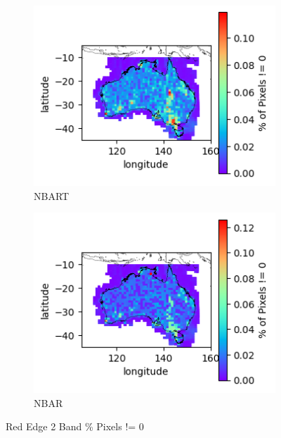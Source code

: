 \documentclass[a4paper]{article}
\begin{document}
      \begin{figure}[h!]
        \centering
          \begin{subfigure}[l]{.4\linewidth}
            \hspace{-32mm}
            \includegraphics[scale=0.9]{plots/nbart/nbart_red_edge_2-PercentDifferent.png}
            \caption{NBART}
          \end{subfigure}
%
          \begin{subfigure}[r]{.4\linewidth}
            \includegraphics[scale=0.9]{plots/nbar/nbar_red_edge_2-PercentDifferent.png}
            \caption{NBAR}
          \end{subfigure}
        \caption{Red Edge 2 Band \% Pixels != 0}\label{figure:28}
      \end{figure}

  \clearpage
\end{document}
